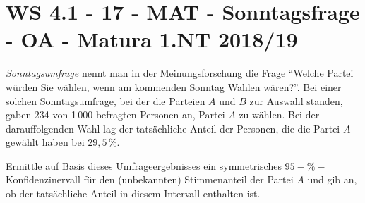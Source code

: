 \section{WS 4.1 - 17 - MAT - Sonntagsfrage - OA - Matura 1.NT 2018/19}

\begin{beispiel}[WS 4.1]{1}
\textit{Sonntagsumfrage} nennt man in der Meinungsforschung die Frage "`Welche Partei würden Sie wählen, wenn am kommenden Sonntag Wahlen wären?"'. Bei einer solchen Sonntagsumfrage, bei der die Parteien $A$ und $B$ zur Auswahl standen, gaben 234 von 1\,000 befragten Personen an, Partei $A$ zu wählen. Bei der darauffolgenden Wahl lag der tatsächliche Anteil der Personen, die die Partei $A$ gewählt haben bei $29,5\,\%$.

Ermittle auf Basis dieses Umfrageergebnisses ein symmetrisches $95-\%-$Konfidenzinervall für den (unbekannten) Stimmenanteil der Partei $A$ und gib an, ob der tatsächliche Anteil in diesem Intervall enthalten ist.

\end{beispiel}
